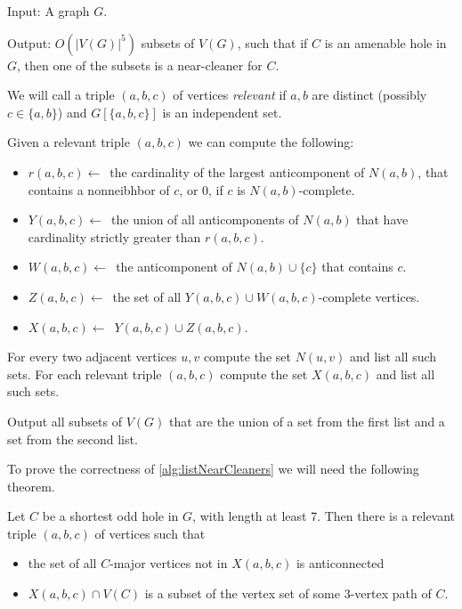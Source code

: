 \begin{alg}
	\label{alg:listNearCleaners}
	Input: A graph $G$.

	\noindent Output: $O(|V(G)|^5)$ subsets of $V(G)$, such that if $C$ is an amenable hole in $G$, then one of the subsets is a near-cleaner for $C$.
\end{alg}
\begin{algtext}
	We will call a triple $(a, b, c)$ of vertices \emph{relevant} if $a, b$ are distinct (possibly $c \in \{a, b\}$) and $G[\{a,b,c\}]$ is an independent set.

	Given a relevant triple $(a, b, c)$ we can compute the following:
	\begin{itemize}
		\item $r(a,b,c) \leftarrow$~the cardinality of the largest anticomponent of $N(a, b)$, that contains a nonneibhbor of $c$, or 0, if $c$ is $N(a, b)$-complete.
		\item $Y(a,b,c) \leftarrow$~the union of all anticomponents of $N(a, b)$ that have cardinality strictly greater than $r(a, b, c)$.
		\item $W(a, b, c) \leftarrow$~the anticomponent of $N(a,b) \cup \{c\}$ that contains $c$.
		\item $Z(a, b, c) \leftarrow$~the set of all $Y(a, b, c) \cup W(a,b,c)$-complete vertices.
		\item $X(a, b, c) \leftarrow$~$Y(a,b,c) \cup Z(a,b,c)$.
	\end{itemize}

	For every two adjacent vertices $u, v$ compute the set $N(u, v)$ and list all such sets.
	For each relevant triple $(a,b,c)$ compute the set $X(a,b,c)$ and list all such sets.

	Output all subsets of $V(G)$ that are the union of a set from the first list and a set from the second list.
\end{algtext}

To prove the correctness of \cref{alg:listNearCleaners} we will need the following theorem.

\begin{theorem}[9.1 of \cite{MC05}]
	\label{thm:91}
	Let $C$ be a shortest odd hole in $G$, with length at least 7. Then there is a relevant triple $(a, b, c)$ of vertices such that
	\begin{itemize}
		\item the set of all $C$-major vertices not in $X(a, b, c)$ is anticonnected
		\item $X(a, b, c) \cap V(C)$ is a subset of the vertex set of some 3-vertex path of $C$.
	\end{itemize}
\end{theorem}


